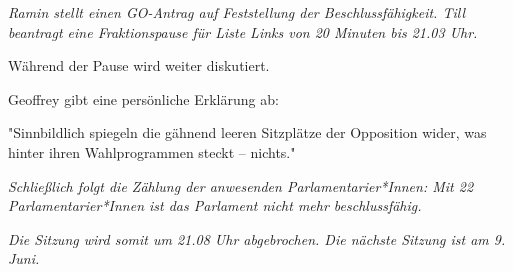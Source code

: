 \documentclass[ngerman,headheight=70pt]{scrartcl}
\begin{document}
    \textit{Ramin stellt einen GO-Antrag auf Feststellung der Beschlussfähigkeit.
    Till beantragt eine Fraktionspause für Liste Links von 20 Minuten bis 21.03 Uhr.}

    Während der Pause wird weiter diskutiert.

    Geoffrey gibt eine persönliche Erklärung ab:

    "Sinnbildlich spiegeln die gähnend leeren Sitzplätze der Opposition
    wider, was hinter ihren Wahlprogrammen steckt -- nichts."

    \textit{Schließlich folgt die Zählung der anwesenden Parlamentarier*Innen: Mit 22
    Parlamentarier*Innen ist das Parlament nicht mehr beschlussfähig.}

    \textit{Die Sitzung wird somit um 21.08 Uhr abgebrochen. Die nächste Sitzung
    ist am 9. Juni.}
\end{document}
